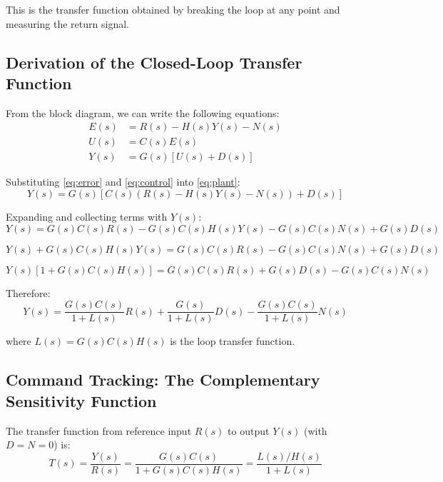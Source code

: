 This is the transfer function obtained by breaking the loop at any point and measuring the return signal.

\subsection{Derivation of the Closed-Loop Transfer Function}

From the block diagram, we can write the following equations:
\begin{align}
E(s) &= R(s) - H(s)Y(s) - N(s) \label{eq:error}\\
U(s) &= C(s)E(s) \label{eq:control}\\
Y(s) &= G(s)[U(s) + D(s)] \label{eq:plant}
\end{align}

Substituting \eqref{eq:error} and \eqref{eq:control} into \eqref{eq:plant}:
\begin{equation}
Y(s) = G(s)\left[C(s)\left(R(s) - H(s)Y(s) - N(s)\right) + D(s)\right]
\end{equation}

Expanding and collecting terms with $Y(s)$:
\begin{equation}
Y(s) = G(s)C(s)R(s) - G(s)C(s)H(s)Y(s) - G(s)C(s)N(s) + G(s)D(s)
\end{equation}

\begin{equation}
Y(s) + G(s)C(s)H(s)Y(s) = G(s)C(s)R(s) - G(s)C(s)N(s) + G(s)D(s)
\end{equation}

\begin{equation}
Y(s)[1 + G(s)C(s)H(s)] = G(s)C(s)R(s) + G(s)D(s) - G(s)C(s)N(s)
\end{equation}

Therefore:
\begin{equation}
\boxed{Y(s) = \frac{G(s)C(s)}{1 + L(s)}R(s) + \frac{G(s)}{1 + L(s)}D(s) - \frac{G(s)C(s)}{1 + L(s)}N(s)}
\label{eq:complete_output}
\end{equation}

where $L(s) = G(s)C(s)H(s)$ is the loop transfer function.

\subsection{Command Tracking: The Complementary Sensitivity Function}

The transfer function from reference input $R(s)$ to output $Y(s)$ (with $D = N = 0$) is:
\begin{equation}
T(s) = \frac{Y(s)}{R(s)} = \frac{G(s)C(s)}{1 + G(s)C(s)H(s)} = \frac{L(s)/H(s)}{1 + L(s)}
\label{eq:complementary_sensitivity}
\end{equation}

